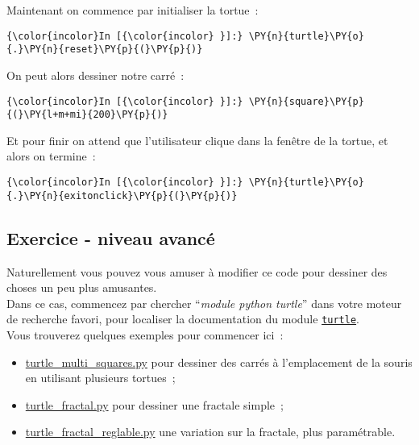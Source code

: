     Maintenant on commence par initialiser la tortue~:

    \begin{Verbatim}[commandchars=\\\{\}]
{\color{incolor}In [{\color{incolor} }]:} \PY{n}{turtle}\PY{o}{.}\PY{n}{reset}\PY{p}{(}\PY{p}{)}
\end{Verbatim}


    On peut alors dessiner notre carré~:

    \begin{Verbatim}[commandchars=\\\{\}]
{\color{incolor}In [{\color{incolor} }]:} \PY{n}{square}\PY{p}{(}\PY{l+m+mi}{200}\PY{p}{)}
\end{Verbatim}


    Et pour finir on attend que l'utilisateur clique dans la fenêtre de la
tortue, et alors on termine~:

    \begin{Verbatim}[commandchars=\\\{\}]
{\color{incolor}In [{\color{incolor} }]:} \PY{n}{turtle}\PY{o}{.}\PY{n}{exitonclick}\PY{p}{(}\PY{p}{)}
\end{Verbatim}


    \hypertarget{exercice---niveau-avancuxe9}{%
\subsection{Exercice - niveau
avancé}\label{exercice---niveau-avancuxe9}}

    Naturellement vous pouvez vous amuser à modifier ce code pour dessiner
des choses un peu plus amusantes.\\

Dans ce cas, commencez par chercher ``\emph{module python turtle}'' dans
votre moteur de recherche favori, pour localiser la documentation du
module
\href{https://docs.python.org/3/library/turtle.html}{\texttt{turtle}}.\\

Vous trouverez quelques exemples pour commencer ici~:
\begin{itemize}
	\item 
	\href{media/turtle_multi_squares.py}{turtle\_multi\_squares.py} pour
	dessiner des carrés à l'emplacement de la souris en utilisant plusieurs
	tortues~;
	\item
	\href{media/turtle_fractal.py}{turtle\_fractal.py} pour
	dessiner une fractale simple~;
	\item \href{media/turtle_fractal_reglable.py}{turtle\_fractal\_reglable.py}
	une variation sur la fractale, plus paramétrable.
\end{itemize}